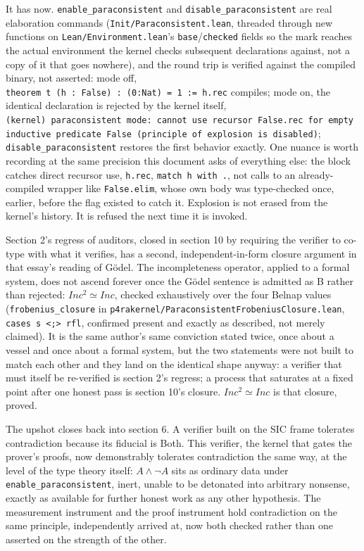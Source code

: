 It has now. \texttt{enable\_paraconsistent} and
\texttt{disable\_paraconsistent} are real elaboration commands
(\texttt{Init/Paraconsistent.lean}, threaded through new functions on
\texttt{Lean/Environment.lean}'s \texttt{base}/\texttt{checked} fields
so the mark reaches the actual environment the kernel checks subsequent
declarations against, not a copy of it that goes nowhere), and the round
trip is verified against the compiled binary, not asserted: mode off,
\texttt{theorem\ t\ (h\ :\ False)\ :\ (0:Nat)\ =\ 1\ :=\ h.rec}
compiles; mode on, the identical declaration is rejected by the kernel
itself,
\texttt{(kernel)\ paraconsistent\ mode:\ cannot\ use\ recursor\ \textquotesingle{}False.rec\textquotesingle{}\ for\ empty\ inductive\ predicate\ \textquotesingle{}False\textquotesingle{}\ (principle\ of\ explosion\ is\ disabled)};
\texttt{disable\_paraconsistent} restores the first behavior exactly.
One nuance is worth recording at the same precision this document asks
of everything else: the block catches direct recursor use,
\texttt{h.rec}, \texttt{match\ h\ with\ .}, not calls to an
already-compiled wrapper like \texttt{False.elim}, whose own body was
type-checked once, earlier, before the flag existed to catch it.
Explosion is not erased from the kernel's history. It is refused the
next time it is invoked.

Section 2's regress of auditors, closed in section 10 by requiring the
verifier to co-type with what it verifies, has a second,
independent-in-form closure argument in that essay's reading of Gödel.
The incompleteness operator, applied to a formal system, does not ascend
forever once the Gödel sentence is admitted as B rather than rejected:
\({Inc^2 ≃ Inc}\), checked exhaustively over the four Belnap values
(\texttt{frobenius\_closure} in
\texttt{p4rakernel/ParaconsistentFrobeniusClosure.lean},
\texttt{cases\ s\ \textless{};\textgreater{}\ rfl}, confirmed present
and exactly as described, not merely claimed). It is the same author's
same conviction stated twice, once about a vessel and once about a
formal system, but the two statements were not built to match each other
and they land on the identical shape anyway: a verifier that must itself
be re-verified is section 2's regress; a process that saturates at a
fixed point after one honest pass is section 10's closure.
\({Inc^2 ≃ Inc}\) is that closure, proved.

The upshot closes back into section 6. A verifier built on the SIC frame
tolerates contradiction because its fiducial is Both. This verifier, the
kernel that gates the prover's proofs, now demonstrably tolerates
contradiction the same way, at the level of the type theory itself:
\({A ∧ ¬A}\) sits as ordinary data under
\texttt{enable\_paraconsistent}, inert, unable to be detonated into
arbitrary nonsense, exactly as available for further honest work as any
other hypothesis. The measurement instrument and the proof instrument
hold contradiction on the same principle, independently arrived at, now
both checked rather than one asserted on the strength of the other.

